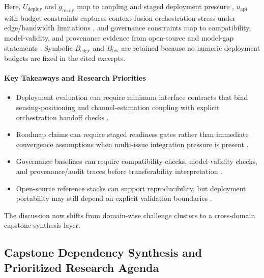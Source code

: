 \documentclass[lettersize,journal]{IEEEtran}
\begin{document}
Here, $U_{\mathrm{deploy}}$ and $g_{\mathrm{ready}}$ map to coupling and staged deployment pressure \cite{O_ISAC_039, O_ISAC_163}, $u_{\mathrm{api}}$ with budget constraints captures context-fusion orchestration stress under edge/bandwidth limitations \cite{O_ISAC_151}, and governance constraints map to compatibility, model-validity, and provenance evidence from open-source and model-gap statements \cite{O_ISAC_200}. Symbolic $B_{\mathrm{edge}}$ and $B_{\mathrm{bw}}$ are retained because no numeric deployment budgets are fixed in the cited excerpts.

\paragraph{Key Takeaways and Research Priorities}
\begin{itemize}
    \item Deployment evaluation can require minimum interface contracts that bind sensing-positioning and channel-estimation coupling with explicit orchestration handoff checks \cite{O_ISAC_039, O_ISAC_151}.
    \item Roadmap claims can require staged readiness gates rather than immediate convergence assumptions when multi-issue integration pressure is present \cite{O_ISAC_163}.
    \item Governance baselines can require compatibility checks, model-validity checks, and provenance/audit traces before transferability interpretation \cite{O_ISAC_200}.
    \item Open-source reference stacks can support reproducibility, but deployment portability may still depend on explicit validation boundaries \cite{O_ISAC_200}.
\end{itemize}

The discussion now shifts from domain-wise challenge clusters to a cross-domain capstone synthesis layer.

\subsection{Capstone Dependency Synthesis and Prioritized Research Agenda}
\end{document}
